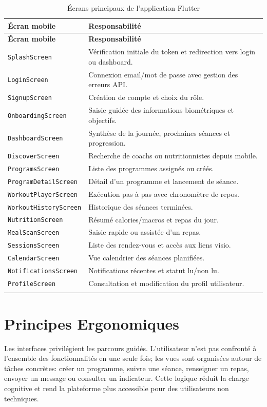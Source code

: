 \begin{longtable}{|p{4cm}|p{11cm}|}
\hline
\rowcolor[HTML]{FFF2CC}
\textbf{Écran mobile} & \textbf{Responsabilité} \\ \hline
\endfirsthead
\hline
\rowcolor[HTML]{FFF2CC}
\textbf{Écran mobile} & \textbf{Responsabilité} \\ \hline
\endhead
\texttt{SplashScreen} & Vérification initiale du token et redirection vers login ou dashboard. \\ \hline
\texttt{LoginScreen} & Connexion email/mot de passe avec gestion des erreurs API. \\ \hline
\texttt{SignupScreen} & Création de compte et choix du rôle. \\ \hline
\texttt{OnboardingScreen} & Saisie guidée des informations biométriques et objectifs. \\ \hline
\texttt{DashboardScreen} & Synthèse de la journée, prochaines séances et progression. \\ \hline
\texttt{DiscoverScreen} & Recherche de coachs ou nutritionnistes depuis mobile. \\ \hline
\texttt{ProgramsScreen} & Liste des programmes assignés ou créés. \\ \hline
\texttt{ProgramDetailScreen} & Détail d’un programme et lancement de séance. \\ \hline
\texttt{WorkoutPlayerScreen} & Exécution pas à pas avec chronomètre de repos. \\ \hline
\texttt{WorkoutHistoryScreen} & Historique des séances terminées. \\ \hline
\texttt{NutritionScreen} & Résumé calories/macros et repas du jour. \\ \hline
\texttt{MealScanScreen} & Saisie rapide ou assistée d’un repas. \\ \hline
\texttt{SessionsScreen} & Liste des rendez-vous et accès aux liens visio. \\ \hline
\texttt{CalendarScreen} & Vue calendrier des séances planifiées. \\ \hline
\texttt{NotificationsScreen} & Notifications récentes et statut lu/non lu. \\ \hline
\texttt{ProfileScreen} & Consultation et modification du profil utilisateur. \\ \hline
\caption{Écrans principaux de l'application Flutter}
\end{longtable}

\section{Principes Ergonomiques}
Les interfaces privilégient les parcours guidés. L'utilisateur n'est pas confronté à l'ensemble des fonctionnalités en une seule fois; les vues sont organisées autour de tâches concrètes: créer un programme, suivre une séance, renseigner un repas, envoyer un message ou consulter un indicateur. Cette logique réduit la charge cognitive et rend la plateforme plus accessible pour des utilisateurs non techniques.

